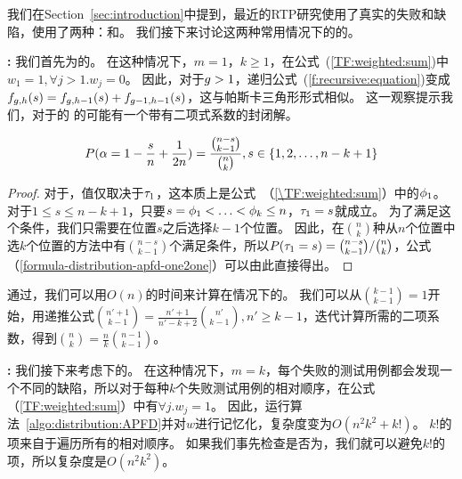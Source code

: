 我们在Section~\ref{sec:introduction}中提到，最近的RTP研究使用了真实的失败和缺陷，使用了两种\mappingMatrices{}：\mappingAllToOne{}和\mappingOneToOne{}。
我们接下来讨论这两种常用情况下的\APFD{}的\distributions{}。

\noindent\textbf{\allToOneSec{} \mappingAllToOne{}:}
我们首先为\APFD{}的\distribution{}。
在这种情况下，$m=1$，$k\ge 1$，在公式~(\ref{TF:weighted:sum})中$w_1=1,\forall j>1.w_j=0$。
因此，对于$g>1$，递归公式~(\ref{f:recursive:equation})变成$f_{g,h}(s)=f_{g,h-1}(s)+f_{g-1,h-1}(s)$，这与帕斯卡三角形形式相似。
这一观察提示我们，对于\mappingAllToOne{}的 \APFD{}的\distribution{}可能有一个带有二项式系数的封闭解。

\begin{mytheorem}\label{distribution-apfd-one2one}
\begin{equation}\label{formula-distribution-apfd-one2one}
    P(\mathrm{\alpha}{}= 1-\frac{s}{n}+\frac{1}{2n})=\frac{\binom{n-s}{k-1}}{\binom{n}{k}},s\in\{1,2,\ldots,n-k+1\}
\end{equation}
\end{mytheorem}
\begin{proof}
对于\mappingAllToOne{}，\APFD{}值仅取决于$\tau_1$，这本质上是公式~（\ref{\TF:weighted:sum}）中的$\phi_1$。
对于$1\le s\le n-k+1$，只要$s=\phi_1<\ldots<\phi_k\le n$，$\tau_1=s$就成立。
为了满足这个条件，我们只需要在位置$s$之后选择$k-1$个位置。
因此，在$\binom{n}{k}$种从$n$个位置中选$k$个位置的方法中有$\binom{n-s}{k-1}$个满足条件，所以$P(\tau_1= s)=\binom{n-s}{k-1}/\binom{n}{k}$，公式（\ref{formula-distribution-apfd-one2one}）可以由此直接得出。
\end{proof}

通过，我们可以用$O(n)$的时间来计算\APFD{}在\mappingAllToOne{}情况下的\distribution{}。
我们可以从$\binom{k-1}{k-1}=1$开始，用递推公式$\binom{n'+1}{k-1}=\frac{n'+1}{n'-k+2}\binom{n'}{k-1}, n'\ge k-1$，迭代计算所需的二项系数，得到$\binom{n}{k}=\frac{n}{k}\binom{n-1}{k-1}$。

\noindent\textbf{\oneToOneSec{} \mappingOneToOne{}:} 我们接下来考虑\mappingOneToOne{}下\APFD{}的\distribution{}。
在这种情况下，$m=k$，每个失败的测试用例都会发现一个不同的缺陷，所以对于每种$k$个失败测试用例的相对顺序，在公式（\ref{TF:weighted:sum}）中有$\forall j.w_j=1$。
因此，运行算法~\ref{algo:distribution:APFD}并对$w$进行记忆化，复杂度变为$O(n^2k^2+k!)$。
$k!$的项来自于遍历所有的相对顺序。
如果我们事先检查\mappingMatrix{}是否为\mappingOneToOne{}，我们就可以避免$k!$的项，所以复杂度是$O(n^2k^2)$。

